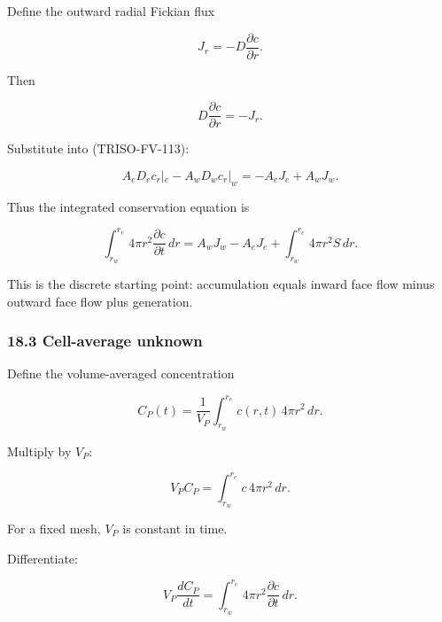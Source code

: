 \documentclass[11pt,a4paper]{article}
\begin{document}
Define the outward radial Fickian flux

\begin{equation}
J_r=-D\frac{\partial c}{\partial r}.
\tag{TRISO-FV-114}
\label{eq:triso-fv-114}
\end{equation}

Then

\begin{equation}
D\frac{\partial c}{\partial r}=-J_r.
\tag{TRISO-FV-115}
\label{eq:triso-fv-115}
\end{equation}

Substitute into (TRISO-FV-113):

\begin{equation}
A_eD_e c_r|_e-A_wD_wc_r|_w
=
-A_eJ_e+A_wJ_w.
\tag{TRISO-FV-116}
\label{eq:triso-fv-116}
\end{equation}

Thus the integrated conservation equation is

\begin{equation}
\int_{r_w}^{r_e}
4\pi r^2
\frac{\partial c}{\partial t}\,dr
=
A_wJ_w-A_eJ_e
+
\int_{r_w}^{r_e}4\pi r^2S\,dr.
\tag{TRISO-FV-117}
\label{eq:triso-fv-117}
\end{equation}

This is the discrete starting point: accumulation equals inward face flow minus outward face flow plus generation.

\subsubsection*{18.3 Cell-average unknown}

Define the volume-averaged concentration

\begin{equation}
\boxed{
C_P(t)
=
\frac1{V_P}
\int_{r_w}^{r_e}
c(r,t)\,4\pi r^2\,dr.
}
\tag{TRISO-FV-118}
\label{eq:triso-fv-118}
\end{equation}

Multiply by $V_P$:

\begin{equation}
V_PC_P
=
\int_{r_w}^{r_e}
c\,4\pi r^2\,dr.
\tag{TRISO-FV-119}
\label{eq:triso-fv-119}
\end{equation}

For a fixed mesh, $V_P$ is constant in time.

Differentiate:

\begin{equation}
V_P\frac{dC_P}{dt}
=
\int_{r_w}^{r_e}
4\pi r^2
\frac{\partial c}{\partial t}\,dr.
\tag{TRISO-FV-120}
\label{eq:triso-fv-120}
\end{equation}
\end{document}
